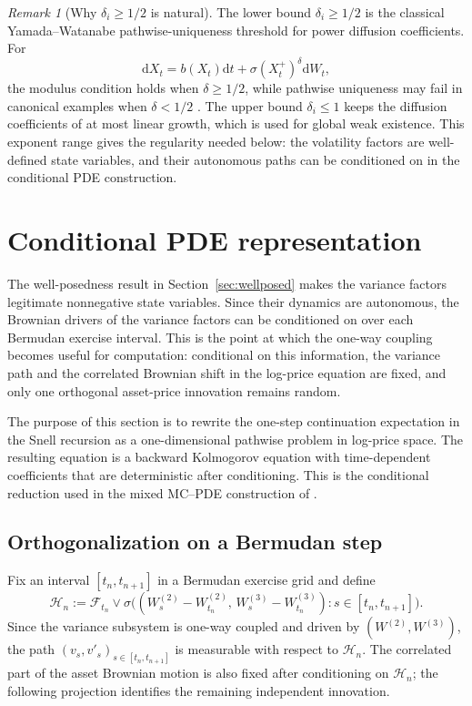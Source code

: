 \documentclass[10pt]{article}
\theoremstyle{plain}
\theoremstyle{definition}
\theoremstyle{remark}
\newtheorem{remark}[theorem]{Remark}
\newcommand{\dd}{\mathrm d}
\begin{document}
\begin{remark}[Why $\delta_i\ge 1/2$ is natural]\label{rem:delta-half}
The lower bound $\delta_i\ge1/2$ is the classical Yamada--Watanabe pathwise-uniqueness threshold for power diffusion coefficients. For
\[
\dd X_t=b(X_t)\dd t+\sigma (X_t^+)^\delta \dd W_t,
\]
the modulus condition holds when $\delta\ge1/2$, while pathwise uniqueness may fail in canonical examples when $\delta<1/2$ \citep{yamada1971uniqueness}. The upper bound $\delta_i\le1$ keeps the diffusion coefficients of at most linear growth, which is used for global weak existence. This exponent range gives the regularity needed below: the volatility factors are well-defined state variables, and their autonomous paths can be conditioned on in the conditional PDE construction.
\end{remark}

\section{Conditional PDE representation}\label{sec:conditional_pde}
The well-posedness result in Section~\ref{sec:wellposed} makes the variance factors legitimate nonnegative
state variables. Since their dynamics are autonomous, the Brownian drivers of the variance factors can be
conditioned on over each Bermudan exercise interval. This is the point at which the one-way coupling becomes
useful for computation: conditional on this information, the variance path and the correlated Brownian shift in
the log-price equation are fixed, and only one orthogonal asset-price innovation remains random.

The purpose of this section is to rewrite the one-step continuation expectation in the Snell recursion as a
one-dimensional pathwise problem in log-price space. The resulting equation is a backward Kolmogorov equation
with time-dependent coefficients that are deterministic after conditioning. This is the conditional reduction
used in the mixed MC--PDE construction of \cite{farahany2020mixing}.

\subsection{Orthogonalization on a Bermudan step}

Fix an interval $[t_n,t_{n+1}]$ in a Bermudan exercise grid and define
\[
\mathcal H_n :=
\mathcal F_{t_n}\vee
\sigma\bigl((W^{(2)}_s-W^{(2)}_{t_n},\,W^{(3)}_s-W^{(3)}_{t_n}):s\in[t_n,t_{n+1}]\bigr).
\]
Since the variance subsystem is one-way coupled and driven by $(W^{(2)},W^{(3)})$, the path
$(v_s,v'_s)_{s\in[t_n,t_{n+1}]}$ is measurable with respect to $\mathcal H_n$.
The correlated part of the asset Brownian motion is also fixed after conditioning on $\mathcal H_n$; the
following projection identifies the remaining independent innovation.
\end{document}
